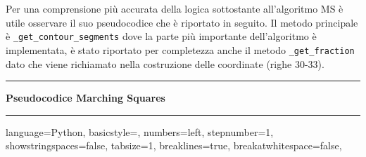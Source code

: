 \documentclass[12pt,a4paper]{report}
\begin{document}
Per una comprensione più accurata della logica sottostante all'algoritmo MS è utile osservare il suo pseudocodice che è riportato in seguito. \newline
Il metodo principale è \verb|_get_contour_segments| dove la parte più importante dell'algoritmo è implementata, è stato riportato per completezza anche il metodo \verb|_get_fraction| dato che viene richiamato nella costruzione delle coordinate (righe 30-33). 
\\[10pt]
\noindent\rule[0.5ex]{\linewidth}{2pt}
\small{\textbf{Pseudocodice Marching Squares}} \\
\noindent\rule[0.5ex]{\linewidth}{1pt}
\lstset
{ %
    language=Python,
    basicstyle=\footnotesize,
    numbers=left,
    stepnumber=1,
    showstringspaces=false,
    tabsize=1,
    breaklines=true,
    breakatwhitespace=false,
}
\end{document}
